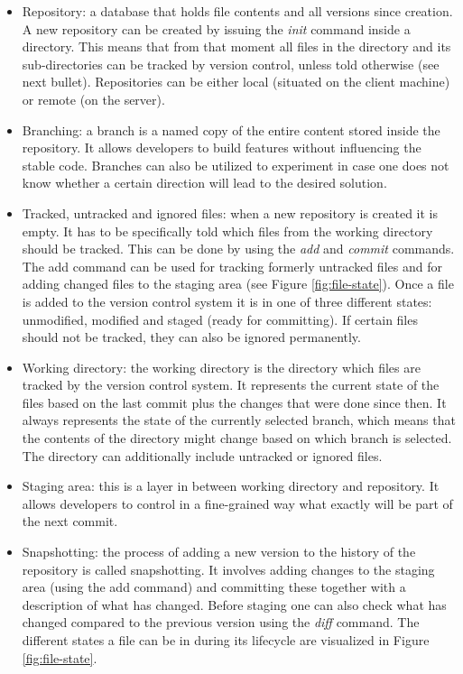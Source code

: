 \begin{itemize}
  \item Repository: a database that holds file contents and all versions since creation. A new repository can be created by issuing the \textit{init} command inside a directory. This means that from that moment all files in the directory and its sub-directories can be tracked by version control, unless told otherwise (see next bullet). Repositories can be either local (situated on the client machine) or remote (on the server).
  \item Branching: a branch is a named copy of the entire content stored inside the repository. It allows developers to build features without influencing the stable code. Branches can also be utilized to experiment in case one does not know whether a certain direction will lead to the desired solution.
  \item Tracked, untracked and ignored files: when a new repository is created it is empty. It has to be specifically told which files from the working directory should be tracked. This can be done by using the \textit{add} and \textit{commit} commands. The add command can be used for tracking formerly untracked files and for adding changed files to the staging area (see Figure \ref{fig:file-state}). Once a file is added to the version control system it is in one of three different states: unmodified, modified and staged (ready for committing). If certain files should not be tracked, they can also be ignored permanently.
  \item Working directory: the working directory is the directory which files are tracked  by the version control system. It represents the current state of the files based on the last commit plus the changes that were done since then. It always represents the state of the currently selected branch, which means that the contents of the directory might change based on which branch is selected. The directory can additionally include untracked or ignored files.
  \item Staging area: this is a layer in between working directory and repository. It allows developers to control in a fine-grained way what exactly will be part of the next commit.
  \item Snapshotting: the process of adding a new version to the history of the repository is called snapshotting. It involves adding changes to the staging area (using the add command) and committing these together with a description of what has changed.  Before staging one can also check what has changed compared to the previous version using the \textit{diff} command. The different states a file can be in during its lifecycle are visualized in Figure \ref{fig:file-state}.

\end{itemize}
